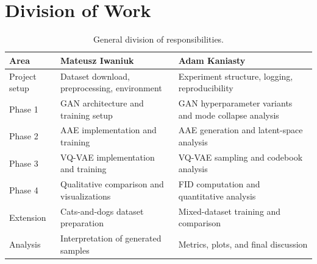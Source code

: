 \documentclass[11pt,a4paper]{article}
\begin{document}
\section{Division of Work}
\begin{table}[h]
\centering
\small
\caption{General division of responsibilities.}
\begin{tabularx}{\textwidth}{@{}lXX@{}}
\toprule
\textbf{Area} & \textbf{Mateusz Iwaniuk} & \textbf{Adam Kaniasty} \\ \midrule
Project setup & Dataset download, preprocessing, environment & Experiment structure, logging, reproducibility \\
Phase 1 & GAN architecture and training setup & GAN hyperparameter variants and mode collapse analysis \\
Phase 2 & AAE implementation and training & AAE generation and latent-space analysis \\
Phase 3 & VQ-VAE implementation and training & VQ-VAE sampling and codebook analysis \\
Phase 4 & Qualitative comparison and visualizations & FID computation and quantitative analysis \\
Extension & Cats-and-dogs dataset preparation & Mixed-dataset training and comparison \\
Analysis & Interpretation of generated samples & Metrics, plots, and final discussion \\ \bottomrule
\end{tabularx}
\end{table}
\end{document}

